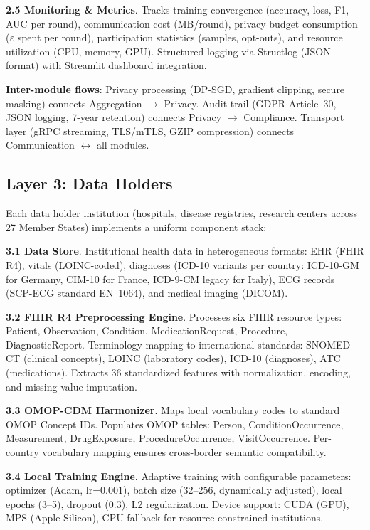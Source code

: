 \documentclass[conference,a4paper]{IEEEtran}
\begin{document}
\textbf{2.5 Monitoring \& Metrics}. Tracks training convergence (accuracy, loss, F1, AUC per round), communication cost (MB/round), privacy budget consumption ($\varepsilon$ spent per round), participation statistics (samples, opt-outs), and resource utilization (CPU, memory, GPU). Structured logging via Structlog (JSON format) with Streamlit dashboard integration.

\textbf{Inter-module flows}: Privacy processing (DP-SGD, gradient clipping, secure masking) connects Aggregation $\to$ Privacy. Audit trail (GDPR Article~30, JSON logging, 7-year retention) connects Privacy $\to$ Compliance. Transport layer (gRPC streaming, TLS/mTLS, GZIP compression) connects Communication $\leftrightarrow$ all modules.

\subsection{Layer 3: Data Holders}

Each data holder institution (hospitals, disease registries, research centers across 27 Member States) implements a uniform component stack:

\textbf{3.1 Data Store}. Institutional health data in heterogeneous formats: EHR (FHIR R4), vitals (LOINC-coded), diagnoses (ICD-10 variants per country: ICD-10-GM for Germany, CIM-10 for France, ICD-9-CM legacy for Italy), ECG records (SCP-ECG standard EN~1064), and medical imaging (DICOM).

\textbf{3.2 FHIR R4 Preprocessing Engine}. Processes six FHIR resource types: Patient, Observation, Condition, MedicationRequest, Procedure, DiagnosticReport. Terminology mapping to international standards: SNOMED-CT (clinical concepts), LOINC (laboratory codes), ICD-10 (diagnoses), ATC (medications). Extracts 36 standardized features with normalization, encoding, and missing value imputation.

\textbf{3.3 OMOP-CDM Harmonizer}. Maps local vocabulary codes to standard OMOP Concept IDs. Populates OMOP tables: Person, ConditionOccurrence, Measurement, DrugExposure, ProcedureOccurrence, VisitOccurrence. Per-country vocabulary mapping ensures cross-border semantic compatibility.

\textbf{3.4 Local Training Engine}. Adaptive training with configurable parameters: optimizer (Adam, lr=0.001), batch size (32--256, dynamically adjusted), local epochs (3--5), dropout (0.3), L2 regularization. Device support: CUDA (GPU), MPS (Apple Silicon), CPU fallback for resource-constrained institutions.
\end{document}
